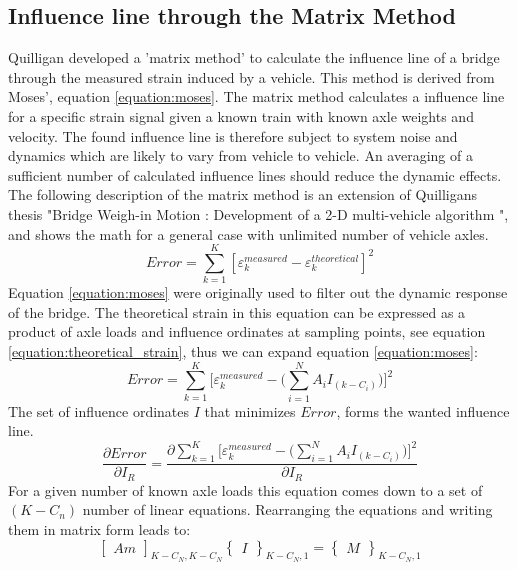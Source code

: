\subsection{Influence line through the Matrix Method}
\label{matrixMethodTheory}
Quilligan \cite{Quilligan} developed a 'matrix method' to calculate the influence line of a bridge through the measured strain induced by a vehicle. This method is derived from Moses', equation \ref{equation:moses}. The matrix method calculates a influence line for a specific strain signal given a known train with known axle weights and velocity. The found influence line is therefore subject to system noise and dynamics which are likely to vary from vehicle to vehicle. An averaging of a sufficient number of calculated influence lines should reduce the dynamic effects. The following description of the matrix method is an extension of Quilligans thesis "Bridge Weigh-in Motion : Development of a 2-D multi-vehicle algorithm \cite{Quilligan}", and shows the math for a general case with unlimited number of vehicle axles.
\begin{equation}
Error = \sum_{k = 1}^{K} [\varepsilon_{k}^{measured} - \varepsilon_{k}^{theoretical}]^2
\label{equation:moses}
\end{equation}
Equation \ref{equation:moses} were originally used to filter out the dynamic response of the bridge.
The theoretical strain in this equation can be expressed as a product of axle loads and influence ordinates at sampling points, see equation \ref{equation:theoretical_strain}, thus we can expand equation \ref{equation:moses}:
\begin{equation}
Error = \sum_{k = 1}^{K} \Big[\varepsilon_{k}^{measured} - \Big(\sum_{i = 1}^{N} A_i I_{(k-C_i)}\Big)\Big]^2
\label{equation:moses_expanded}
\end{equation}
The set of influence ordinates $I$ that minimizes $Error$, forms the wanted influence line.
\begin{equation}
\frac{\partial Error}{\partial I_R} = \frac{\partial \sum_{k = 1}^{K} \Big[\varepsilon_{k}^{measured} - \Big(\sum_{i = 1}^{N} A_i I_{(k-C_i)}\Big)\Big]^2}{\partial I_R}
\end{equation}
For a given number of known axle loads this equation comes down to a set of $(K - C_n)$ number of linear equations. Rearranging the equations and writing them in matrix form leads to:
\begin{equation}
\begin{bmatrix} Am \end{bmatrix}_{K-C_N, K-C_N} \begin{Bmatrix} I \end{Bmatrix}_{K-C_N, 1} = \begin{Bmatrix} M \end{Bmatrix}_{K-C_N, 1}
\label{equation:matrixForm}
\end{equation}
